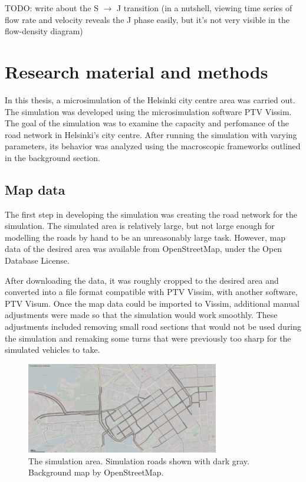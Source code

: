 \documentclass[english, 12pt, a4paper, elec, utf8, pdfa, online]{aaltothesis}
\begin{document}
TODO: write about the S $\to$ J transition (in a nutshell, viewing time series of flow rate and velocity reveals the J phase easily, but it's not very visible in the flow-density diagram)

\clearpage

\section{Research material and methods}

In this thesis, a microsimulation of the Helsinki city centre area was carried out. The simulation was developed using the microsimulation software PTV Vissim. The goal of the simulation was to examine the capacity and perfomance of the road network in Helsinki's city centre. After running the simulation with varying parameters, its behavior was analyzed using the macroscopic frameworks outlined in the background section.

\subsection{Map data}

The first step in developing the simulation was creating the road network for the simulation. The simulated area is relatively large, but not large enough for modelling the roads by hand to be an unreasonably large task. However, map data of the desired area was available from OpenStreetMap, under the Open Database License. \cite{osm}

After downloading the data, it was roughly cropped to the desired area and converted into a file format compatible with PTV Vissim, with another software, PTV Visum. Once the map data could be imported to Vissim, additional manual adjustments were made so that the simulation would work smoothly. These adjustments included removing small road sections that would not be used during the simulation and remaking some turns that were previously too sharp for the simulated vehicles to take.

\begin{figure}[h]
    \centering
    \includegraphics[width=0.75\textwidth]{graphs/vissim_map}
    \caption{The simulation area. Simulation roads shown with dark gray. Background map by OpenStreetMap\cite{osm}.}
\end{figure}
\end{document}

